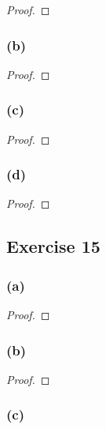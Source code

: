 \documentclass[14pt]{extarticle}
\begin{document}
\begin{proof}

\end{proof}

\subsubsection{(b)}

\begin{proof}

\end{proof}

\subsubsection{(c)}

\begin{proof}

\end{proof}

\subsubsection{(d)}

\begin{proof}

\end{proof}

\subsection{Exercise 15}

\subsubsection{(a)}

\begin{proof}

\end{proof}

\subsubsection{(b)}

\begin{proof}

\end{proof}

\subsubsection{(c)}
\end{document}

